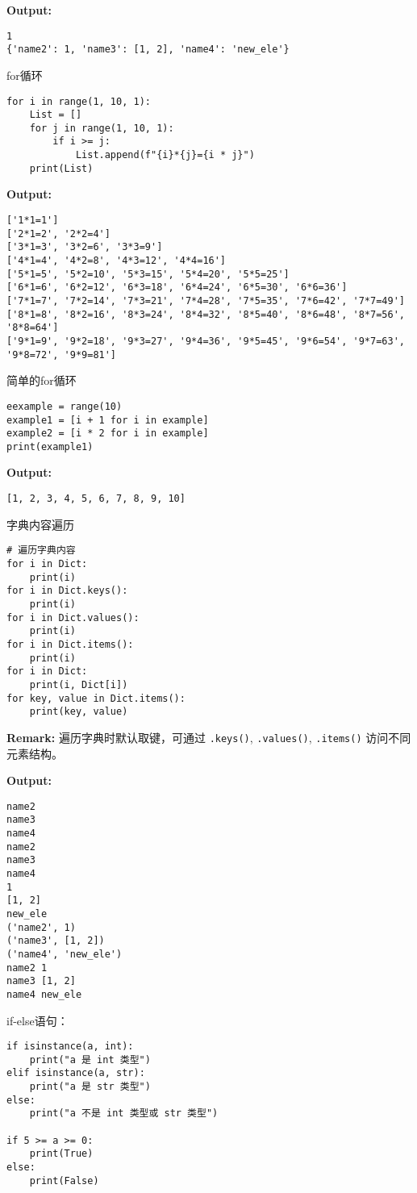 \documentclass{article}
\begin{document}
\textbf{Output:}
\begin{verbatim}
1
{'name2': 1, 'name3': [1, 2], 'name4': 'new_ele'}
\end{verbatim}

for循环
\begin{lstlisting}
for i in range(1, 10, 1):
    List = []
    for j in range(1, 10, 1):
        if i >= j:
            List.append(f"{i}*{j}={i * j}")
    print(List)
\end{lstlisting}
\textbf{Output:}
\begin{verbatim}
['1*1=1']
['2*1=2', '2*2=4']
['3*1=3', '3*2=6', '3*3=9']
['4*1=4', '4*2=8', '4*3=12', '4*4=16']
['5*1=5', '5*2=10', '5*3=15', '5*4=20', '5*5=25']
['6*1=6', '6*2=12', '6*3=18', '6*4=24', '6*5=30', '6*6=36']
['7*1=7', '7*2=14', '7*3=21', '7*4=28', '7*5=35', '7*6=42', '7*7=49']
['8*1=8', '8*2=16', '8*3=24', '8*4=32', '8*5=40', '8*6=48', '8*7=56', '8*8=64']
['9*1=9', '9*2=18', '9*3=27', '9*4=36', '9*5=45', '9*6=54', '9*7=63', '9*8=72', '9*9=81']
\end{verbatim}

简单的for循环
\begin{lstlisting}
eexample = range(10)
example1 = [i + 1 for i in example]
example2 = [i * 2 for i in example]
print(example1)
\end{lstlisting}

\textbf{Output:}
\begin{verbatim}
[1, 2, 3, 4, 5, 6, 7, 8, 9, 10]
\end{verbatim}

字典内容遍历
\begin{lstlisting}
# 遍历字典内容
for i in Dict:
    print(i)
for i in Dict.keys():
    print(i)
for i in Dict.values():
    print(i)
for i in Dict.items():
    print(i)
for i in Dict:
    print(i, Dict[i])
for key, value in Dict.items():
    print(key, value)
\end{lstlisting}

\textbf{Remark:} 遍历字典时默认取键，可通过 \texttt{.keys()}, \texttt{.values()}, \texttt{.items()} 访问不同元素结构。

\textbf{Output:}
\begin{verbatim}
name2
name3
name4
name2
name3
name4
1
[1, 2]
new_ele
('name2', 1)
('name3', [1, 2])
('name4', 'new_ele')
name2 1
name3 [1, 2]
name4 new_ele
\end{verbatim}

if-else语句：

\begin{lstlisting}
if isinstance(a, int):
    print("a 是 int 类型")
elif isinstance(a, str):
    print("a 是 str 类型")
else:
    print("a 不是 int 类型或 str 类型")

if 5 >= a >= 0:
    print(True)
else:
    print(False)
\end{lstlisting}
\end{document}
